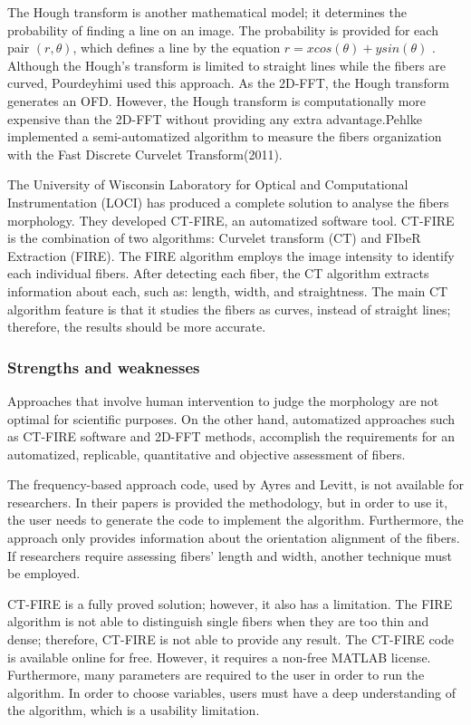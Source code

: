 \documentclass[12pt,a4paper]{article}
\begin{document}
The Hough transform is another mathematical model; it determines the probability of finding a line on an image. The probability is provided for each pair $(r,\theta)$, which defines a line by the equation $r=xcos(\theta)+ysin(\theta)$ .  Although the Hough’s transform is limited to straight lines while the fibers are curved, Pourdeyhimi used this approach. As the 2D-FFT, the Hough transform generates an OFD. However, the Hough transform is computationally more expensive than the 2D-FFT without providing any extra advantage.Pehlke implemented a semi-automatized algorithm to measure the fibers organization with the Fast Discrete Curvelet Transform(2011).

The University of Wisconsin Laboratory for Optical and Computational Instrumentation (LOCI) has produced a complete solution to analyse the fibers morphology. They developed CT-FIRE, an automatized software tool. CT-FIRE is the combination of two algorithms: Curvelet transform (CT) and FIbeR Extraction (FIRE). The FIRE algorithm employs the image intensity to identify each individual fibers. After detecting each fiber, the CT algorithm extracts information about each, such as: length, width, and straightness. The main CT algorithm feature is that it studies the fibers as curves, instead of straight lines; therefore, the results should be more accurate.

\subsubsection{Strengths and weaknesses}

Approaches that involve human intervention to judge the morphology are not optimal for scientific purposes. On the other hand, automatized approaches such as CT-FIRE software and 2D-FFT methods, accomplish the requirements for an automatized, replicable, quantitative and objective assessment of fibers.

The frequency-based approach code, used by Ayres and Levitt, is not available for researchers.  In their papers is provided the methodology, but in order to use it, the user needs to generate the code to implement the algorithm. Furthermore, the approach only provides information about the orientation alignment of the fibers. If researchers require assessing fibers' length and width, another technique must be employed.

CT-FIRE is a fully proved solution; however, it also has a limitation. The FIRE algorithm is not able to distinguish single fibers when they are too thin and dense; therefore, CT-FIRE is not able to provide any result. The CT-FIRE code is available online for free. However, it requires a non-free MATLAB license. Furthermore, many parameters are required to the user in order to run the algorithm. In order to choose variables, users must have a deep understanding of the algorithm, which is a usability limitation. 
\end{document}
